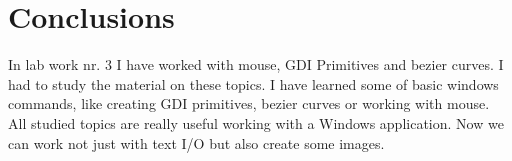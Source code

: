 \section*{Conclusions}

In lab work nr. 3 I have worked with mouse, GDI Primitives and bezier curves. I had to study the material on these topics. I have learned some of basic windows commands, like creating GDI primitives, bezier curves or working with mouse. All studied topics are really useful working with a Windows application. Now we can work not just with text I/O but also create some images.

\clearpage